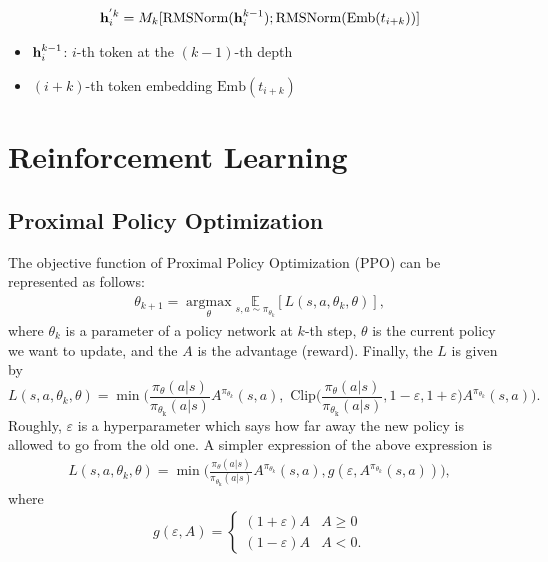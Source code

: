 \begin{align*}
	{\mathbf{h}}_i^{'k} = M_k[\text{RMSNorm}({\mathbf{h}}_i^{k-1}); \text{RMSNorm}(\text{Emb}(t_{i+k}))]
\end{align*}
\begin{itemize}
	\item ${\mathbf{h}}_i^{k-1}$: $i$-th token at the $(k-1)$-th depth 
	\item $(i+k)$-th token embedding $\text{Emb}(t_{i+k})$
\end{itemize}

\section{Reinforcement Learning}
\subsection{Proximal Policy Optimization}
The objective function of Proximal Policy Optimization (PPO) can be represented as follows:
\begin{align*}
	\theta_{k+1} = \underset{\theta}{\operatorname{argmax}} \underset{s,a\sim \pi_{\theta_k}}{\mathbb{E}} [L(s, a, \theta_k, \theta)],
\end{align*}
where $\theta_{k}$ is a parameter of a policy network at $k$-th step, $\theta$ is the current policy we want to update, and the $A$ is the advantage (\ie reward). Finally, the $L$ is given by
$$L(s, a, \theta_k, \theta) = \min \Bigg(\frac{\pi_{\theta}\left(a | s\right)}{\pi_{\theta_{\text {k}}}\left(a | s\right)} A^{\pi_{\theta_k}}(s,a), \textrm{ Clip}\Bigg(\frac{\pi_{\theta}\left(a | s\right)}{\pi_{\theta_{\text {k}}}\left(a | s\right)}, 1-\varepsilon, 1+\varepsilon\Bigg) A^{\pi_{\theta_k}}(s,a)\Bigg).$$
Roughly, $\varepsilon$ is a hyperparameter which says how far away the new policy is allowed to go from the old one. A simpler expression of the above expression is
\begin{align}
	L(s, a, \theta_k, \theta) = \min \Bigg(\frac{\pi_{\theta}\left(a | s\right)}{\pi_{\theta_{\text {k}}}\left(a | s\right)} A^{\pi_{\theta_k}}(s,a), g(\varepsilon, A^{\pi_{\theta_k}}(s,a)) \Bigg),
	\label{eq:ppo_objective}
\end{align}
where 
\begin{align}
	g(\varepsilon,A) = 
	\begin{cases}
		(1+\varepsilon)A & A\geq 0\\
		(1-\varepsilon)A & A< 0.
	\end{cases}
	\label{eq:ppo_clip}
\end{align}

